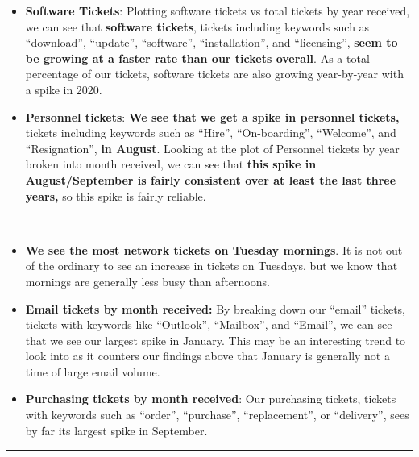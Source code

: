 \documentclass[11pt]{article}
\begin{document}
    \begin{itemize}
\item
  \textbf{Software Tickets}: Plotting software tickets vs total tickets
  by year received, we can see that \textbf{software tickets}, tickets
  including keywords such as ``download'', ``update'', ``software'',
  ``installation'', and ``licensing'', \textbf{seem to be growing at a
  faster rate than our tickets overall}. As a total percentage of our
  tickets, software tickets are also growing year-by-year with a spike
  in 2020.
\item
  \textbf{Personnel tickets}: \textbf{We see that we get a spike in
  personnel tickets,} tickets including keywords such as ``Hire'',
  ``On-boarding'', ``Welcome'', and ``Resignation'', \textbf{in August}.
  Looking at the plot of Personnel tickets by year broken into month
  received, we can see that \textbf{this spike in August/September is
  fairly consistent over at least the last three years,} so this spike
  is fairly reliable.
\end{itemize}

    \begin{center}
    \end{center}
    { \hspace*{\fill} \\}
    
    \begin{itemize}
\item
  \textbf{We see the most network tickets on Tuesday mornings}. It is
  not out of the ordinary to see an increase in tickets on Tuesdays, but
  we know that mornings are generally less busy than afternoons.
\item
  \textbf{Email tickets by month received:} By breaking down our
  ``email'' tickets, tickets with keywords like ``Outlook'',
  ``Mailbox'', and ``Email'', we can see that we see our largest spike
  in January. This may be an interesting trend to look into as it
  counters our findings above that January is generally not a time of
  large email volume.
\item
  \textbf{Purchasing tickets by month received}: Our purchasing tickets,
  tickets with keywords such as ``order'', ``purchase'',
  ``replacement'', or ``delivery'', sees by far its largest spike in
  September.
\end{itemize}

    \begin{center}\rule{0.5\linewidth}{\linethickness}\end{center}
\end{document}
